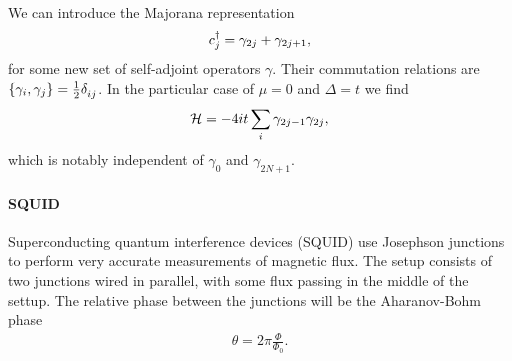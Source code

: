 We can introduce the Majorana representation
\begin{align*}
	c_{j}^{\dagger} = \gamma_{2j} + \gamma_{2j + 1},
\end{align*}
for some new set of self-adjoint operators $\gamma$. Their commutation relations are $\acomm{\gamma_{i}}{\gamma_{j}} = \frac{1}{2}\kdelta{}{ij}$. In the particular case of $\mu = 0$ and $\Delta = t$ we find
\begin{align*}
	\mathcal{H} = -4it\sum\limits_{i}\gamma_{2j - 1}\gamma_{2j},
\end{align*}
which is notably independent of $\gamma_{0}$ and $\gamma_{2N + 1}$.

\paragraph{SQUID}
Superconducting quantum interference devices (SQUID) use Josephson junctions to perform very accurate measurements of magnetic flux. The setup consists of two junctions wired in parallel, with some flux passing in the middle of the settup. The relative phase between the junctions will be the Aharanov-Bohm phase
\begin{align*}
	\theta = 2\pi\frac{\Phi}{\Phi_{0}}.
\end{align*}